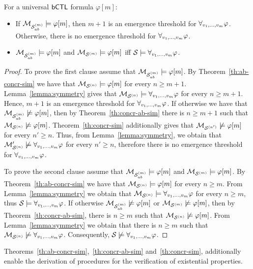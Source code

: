 \begin{corollary}
\label{cor:universal}
For a universal $\sf{bCTL}$ formula $\varphi[m]$:
\begin{itemize}[$\bullet$]
    \item  If $\mathcal{M}_{\mathcal{S}_{ab}^{(m)}} \models \varphi[m]$, then $m + 1$ is an emergence
    threshold for $\forall_{v_1,\ldots,v_m} \varphi$. Otherwise, there is no emergence threshold for
    $\forall_{v_1,\ldots,v_m} \varphi$.
    \item $\mathcal{M}_{\mathcal{S}_{ab}^{(m)}} \models \varphi[m]$ and $\mathcal{M}_{\mathcal{S}^{(m)}} \models \varphi[m]$ iff
    $\mathcal S \models \forall_{v_1,\ldots,v_m} \varphi$.
\end{itemize}
\end{corollary}
\begin{proof}
To prove the first clause assume that $\mathcal{M}_{\mathcal{S}_{ab}^{(m)}} \models \varphi[m]$. By
Theorem~\ref{th:ab-concr-sim} we have that $\mathcal{M}_{\mathcal{S}^{(n)}} \models \varphi[m]$ for
every $n \geq m+1$. Lemma~\ref{lemma:symmetry} gives that  $\mathcal{M}_{\mathcal{S}^{(n)}} \models
\forall_{v_1,\ldots,v_m} \varphi$ for every $n \geq m+1$. Hence, $m+1$ is an emergence threshold for
$\forall_{v_1,\ldots,v_m} \varphi$. If otherwise we have that  $\mathcal{M}_{\mathcal{S}_{ab}^{(m)}} \not \models \varphi[m]$,
then by Theorem~\ref{th:concr-ab-sim} there is $n \geq m+1$ such that $\mathcal{M}_{\mathcal{S}^{(n)}}
\not \models \varphi[m]$. Theorem~\ref{th:concr-sim} additionally gives that
$\mathcal{M}_{\mathcal{S}^{(n')}} \not \models \varphi[m]$ for every $n' \geq n$. Thus, from
Lemma~\ref{lemma:symmetry}, we obtain that $\mathcal{M}_{\mathcal{S}^{(n)}}' \not \models \forall_{v_1,\ldots,v_m} \varphi$
for every $n' \geq n$, therefore there is no emergence threshold for
$\forall_{v_1,\ldots,v_m} \varphi$.

To prove the second clause assume that $\mathcal{M}_{\mathcal{S}_{ab}^{(m)}} \models \varphi[m]$ and $\mathcal{M}_{\mathcal{S}^{(m)}} \models \varphi[m]$. By Theorem~\ref{th:ab-concr-sim} we have that $\mathcal{M}_{\mathcal{S}^{(n)}}
\models \varphi[m]$ for every $n \geq m$. From Lemma~\ref{lemma:symmetry} we
obtain that $\mathcal{M}_{\mathcal{S}^{(n)}} \models \forall_{v_1,\ldots,v_m} \varphi$ for every $n \geq m$, thus $\mathcal S
\models \forall_{v_1,\ldots,v_m} \varphi$. If otherwise $\mathcal{M}_{\mathcal{S}_{ab}^{(m)}} \not \models \varphi[m]$ or $\mathcal{M}_{\mathcal{S}^{(m)}}
\not \models \varphi[m]$, then by Theorem~\ref{th:concr-ab-sim}, there is $n
\geq m$ such that $\mathcal{M}_{\mathcal{S}^{(n)}} \not \models \varphi[m]$.  From
Lemma~\ref{lemma:symmetry} we obtain that there is $n \geq m$ such that $\mathcal{M}_{\mathcal{S}^{(n)}}
\not \models \forall_{v_1,\ldots,v_m} \varphi$. Consequently, $\mathcal S \not \models \forall_{v_1,\ldots,v_m} \varphi$.
\end{proof}


Theorems~\ref{th:ab-concr-sim},~\ref{th:concr-ab-sim} and~\ref{th:concr-sim},
additionally enable the derivation of  procedures for the verification of
existential properties.

